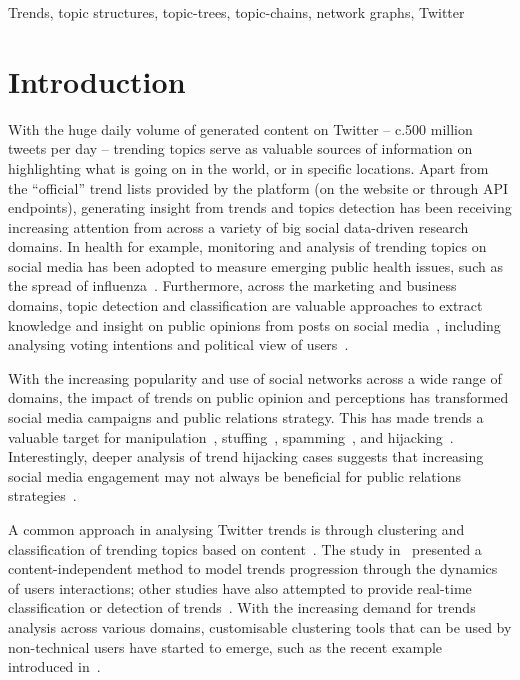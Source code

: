 \documentclass[conference]{IEEEtran}
\begin{document}
\begin{IEEEkeywords}
Trends, topic structures, topic-trees, topic-chains, network graphs, Twitter
\end{IEEEkeywords}

\section{Introduction}\label{intro}

With the huge daily volume of generated content on Twitter -- c.500
million tweets per day -- trending topics serve as valuable sources of
information on highlighting what is going on in the world, or in
specific locations. Apart from the ``official'' trend lists provided
by the platform (on the website or through API endpoints), generating
insight from trends and topics detection has been receiving increasing
attention from across a variety of big social data-driven research
domains. In health for example, monitoring and analysis of trending
topics on social media has been adopted to measure emerging public
health issues, such as the spread of
influenza~\cite{Achrekar2011,Parker2013,Parker2015}. Furthermore,
across the marketing and business domains, topic detection and
classification are valuable approaches to extract knowledge and
insight on public opinions from posts on social
media~\cite{blamey-et-al-2012,Bello2013,albishry-et-al:ssei2018},
including analysing voting intentions and political view of
users~\cite{Fang2015}.

With the increasing popularity and use of social networks across a
wide range of domains, the impact of trends on public opinion and
perceptions has transformed social media campaigns and public
relations strategy. This has made trends a valuable target for
manipulation~\cite{Zhang2017}, stuffing~\cite{Irani2010},
spamming~\cite{Sedhai2015,Chu2012}, and
hijacking~\cite{VanDam2016}. Interestingly, deeper analysis of trend
hijacking cases suggests that increasing social media engagement may
not always be beneficial for public relations
strategies~\cite{Sanderson2016}.

A common approach in analysing Twitter trends is through clustering
and classification of trending topics based on
content~\cite{Zubiaga2011,Benhardus2013,Ferragina2015,albishry-et-al:iccci2017}.
The study in~\cite{TenThij2016} presented a content-independent method
to model trends progression through the dynamics of users
interactions; other studies have also attempted to provide real-time
classification or detection of
trends~\cite{Mathioudakis2010,Zubiaga2015}. With the increasing demand
for trends analysis across various domains, customisable clustering
tools that can be used by non-technical users have started to emerge,
such as the recent example introduced in~\cite{Arn2018}.
\end{document}
